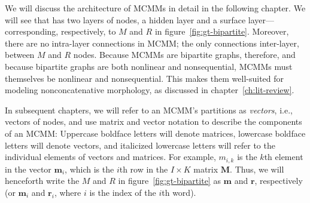 
We will discuss the architecture of MCMMs in detail in the following chapter. 
We will see  that has two
layers of nodes, a hidden layer and a
surface layer---corresponding, respectively, to $M$ and $R$ in
figure~\ref{fig:gt-bipartite}. Moreover, there are no intra-layer connections in
MCMM; the only connections inter-layer, between $M$ and $R$ nodes.
Because MCMMs are bipartite graphs, therefore, and because bipartite graphs are both nonlinear and nonsequential, 
MCMMs must themselves be nonlinear and nonsequential. This makes them well-suited for modeling
nonconcatenative morphology, as discussed in chapter~\ref{ch:lit-review}.


%

In subsequent chapters, we will refer to an MCMM's partitions as
\emph{vectors}, i.e., vectors of nodes, and use matrix and vector notation to
describe the components of an MCMM:
Uppercase boldface letters will denote matrices, %
lowercase boldface letters will denote vectors,
and italicized lowercase letters will refer to the individual elements
of vectors and matrices. %
For example, $m_{i,k}$ is the $k$th  %
element in the vector
$\mathbf{m}_i$, which is the $i$th
row in the $I \times K$ matrix
$\mathbf{M}$. Thus, we will henceforth write the $M$ and $R$ in
figure~\ref{fig:gt-bipartite} as $\mathbf{m}$ and $\mathbf{r}$,
respectively (or $\mathbf{m}_i$ and $\mathbf{r}_i$, where $i$ is the
index of the $i$th
word).

